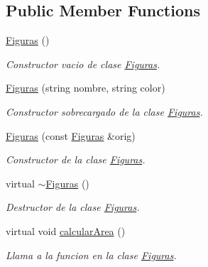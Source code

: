 \subsection*{Public Member Functions}
\begin{DoxyCompactItemize}
\item 
\hypertarget{class_figuras_aa4a6b2a853e7370ae3085650eb4ba54c}{}\label{class_figuras_aa4a6b2a853e7370ae3085650eb4ba54c} 
\hyperlink{class_figuras_aa4a6b2a853e7370ae3085650eb4ba54c}{Figuras} ()
\begin{DoxyCompactList}\small\item\em Constructor vacio de clase \hyperlink{class_figuras}{Figuras}. \end{DoxyCompactList}\item 
\hyperlink{class_figuras_aa27ab1cfbd67dc1d7b806065586875f7}{Figuras} (string nombre, string color)
\begin{DoxyCompactList}\small\item\em Constructor sobrecargado de la clase \hyperlink{class_figuras}{Figuras}. \end{DoxyCompactList}\item 
\hyperlink{class_figuras_aa5cb44be3f36d79786b13fc8d9a7da7f}{Figuras} (const \hyperlink{class_figuras}{Figuras} \&orig)
\begin{DoxyCompactList}\small\item\em Constructor de la clase \hyperlink{class_figuras}{Figuras}. \end{DoxyCompactList}\item 
\hypertarget{class_figuras_a3c630ab1c3c75dd98f38a4e30e7820f2}{}\label{class_figuras_a3c630ab1c3c75dd98f38a4e30e7820f2} 
virtual \hyperlink{class_figuras_a3c630ab1c3c75dd98f38a4e30e7820f2}{$\sim$\+Figuras} ()
\begin{DoxyCompactList}\small\item\em Destructor de la clase \hyperlink{class_figuras}{Figuras}. \end{DoxyCompactList}\item 
\hypertarget{class_figuras_aab7794256f0f226206b840b8668babfe}{}\label{class_figuras_aab7794256f0f226206b840b8668babfe} 
virtual void \hyperlink{class_figuras_aab7794256f0f226206b840b8668babfe}{calcular\+Area} ()
\begin{DoxyCompactList}\small\item\em Llama a la funcion en la clase \hyperlink{class_figuras}{Figuras}. \end{DoxyCompactList}\item 
\hypertarget{class_figuras_a90c8e15e0a6a982baa363bff28d4774d}{}\label{class_figuras_a90c8e15e0a6a982baa363bff28d4774d} 

\end{DoxyCompactItemize}
